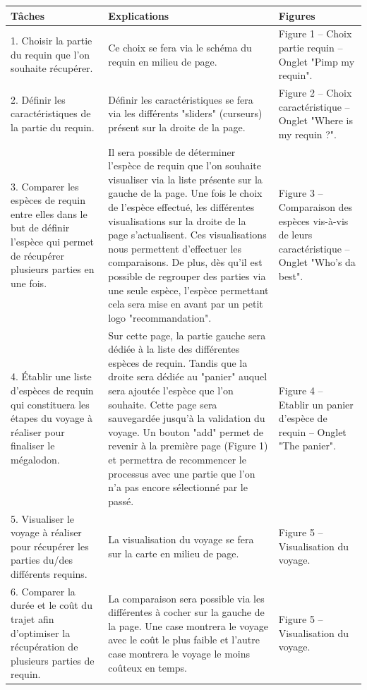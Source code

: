 \documentclass{article}
\begin{document}
\begin{center}
	\begin{tabular}{|p{3.5cm}|p{7cm}|p{3.5cm}|}
		\hline
		Tâches
		&
		Explications
		&
		Figures
		\\\hline
		1. Choisir la partie du requin que l’on souhaite récupérer.
		&
		Ce choix se fera via le schéma du requin en milieu de page.
		&
		Figure 1 – Choix partie requin – Onglet "Pimp my requin".
		\\\hline
		2. Définir les caractéristiques de la partie du requin.
		&
		Définir les caractéristiques se fera via les différents "sliders" (curseurs) présent sur la droite de la page.
		&
		Figure 2 – Choix caractéristique – Onglet "Where is my requin ?".
		\\\hline
		3. Comparer les espèces de requin entre elles dans le but de définir l’espèce qui permet de récupérer plusieurs parties en une fois.
		&
		Il sera possible de déterminer l’espèce de requin que l’on souhaite visualiser via la liste présente sur la gauche de la page. Une fois le choix de l’espèce effectué, les différentes visualisations sur la droite de la page s'actualisent. Ces visualisations nous permettent d’effectuer les comparaisons. De plus, dès qu'il est possible de regrouper des parties via une seule espèce, l'espèce permettant cela sera mise en avant par un petit logo "recommandation".
		&
		Figure 3 – Comparaison des espèces vis-à-vis de leurs caractéristique – Onglet "Who's da best".
		\\\hline
		4. Établir une liste d’espèces de requin qui constituera les étapes du voyage à réaliser pour finaliser le mégalodon.
		&
		Sur cette page, la partie gauche sera dédiée à la liste des différentes espèces de requin. Tandis que la droite sera dédiée au "panier" auquel sera ajoutée l’espèce que l’on souhaite. Cette page sera sauvegardée jusqu’à la validation du voyage. Un bouton "add" permet de revenir à la première page (Figure 1) et permettra de recommencer le processus avec une partie que l’on n'a pas encore sélectionné par le passé.
		&
		Figure 4 – Etablir un panier d’espèce de requin – Onglet "The panier".
		\\\hline
		5. Visualiser le voyage à réaliser pour récupérer les parties du/des différents requins.
		&
		La visualisation du voyage se fera sur la carte en milieu de page.
		&
		Figure 5 – Visualisation du voyage.
		\\\hline
		6. Comparer la durée et le coût du trajet afin d’optimiser la récupération de plusieurs parties de requin.
		&
		La comparaison sera possible via les différentes à cocher sur la gauche de la page. Une case montrera le voyage avec le coût le plus faible et l’autre case montrera le voyage le moins coûteux en temps.
		&
		Figure 5 – Visualisation du voyage.
		\\\hline
	\end{tabular}
\end{center}
\end{document}
